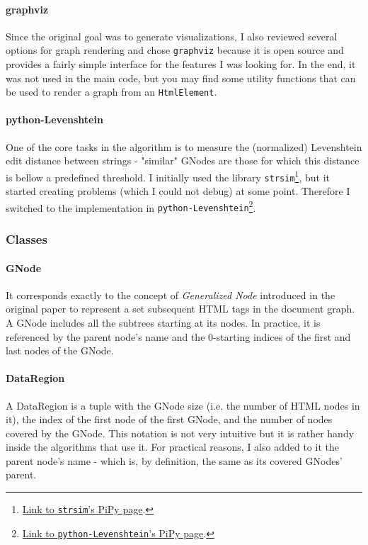\documentclass[10pt]{article}
\newcommand{\code}[1]{\colorbox{codegray}{\texttt{#1}}}
\begin{document}
\paragraph{graphviz} Since the original goal was to generate visualizations, I also reviewed several options for graph rendering and chose \code{graphviz} because it is open source and provides a fairly simple interface for the features I was looking for. In the end, it was not used in the main code, but you may find some utility functions that can be used to render a graph from an \code{HtmlElement}.

\paragraph{python-Levenshtein} One of the core tasks in the algorithm is to measure the (normalized) Levenshtein edit distance between strings - "similar" GNodes are those for which this distance is bellow a predefined threshold. I initially used the library \code{strsim}\footnote{\href{https://pypi.org/project/strsim/}{Link to \code{strsim}'s PiPy page}.}, but it started creating problems (which I could not debug) at some point. Therefore I switched to the implementation in \code{python-Levenshtein}\footnote{\href{https://pypi.org/project/python-Levenshtein/}{Link to \code{python-Levenshtein}'s PiPy page}.}.



\subsubsection{Classes}

\paragraph{GNode}

It corresponds exactly to the concept of \emph{Generalized Node} introduced in the original paper to represent a set subsequent HTML tags in the document graph. A GNode includes all the subtrees starting at its nodes. In practice, it is referenced by the parent node's name and the 0-starting indices of the first and last nodes of the GNode.

\paragraph{DataRegion} A DataRegion is a tuple with the GNode size (i.e. the number of HTML nodes in it), the index of the first node of the first GNode, and the number of nodes covered by the GNode. This notation is not very intuitive but it is rather handy inside the algorithms that use it. For practical reasons, I also added to it the parent node's name - which is, by definition, the same as its covered GNodes' parent. 
\end{document}
